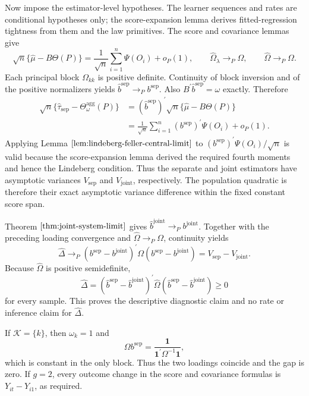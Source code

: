 Now impose the estimator-level hypotheses. The learner sequences and rates are conditional hypotheses only; the score-expansion lemma derives fitted-regression tightness from them and the law primitives. The score and covariance lemmas give
\[
 \sqrt n\{\widehat\mu-B\Theta(P)\}
 =\frac1{\sqrt n}\sum_{i=1}^n\Psi(O_i)+o_P(1),
 \qquad
 \widehat\Omega_\lambda\to_P\Omega,
 \qquad
 \widehat\Omega\to_P\Omega.
\]
Each principal block \(\Omega_{kk}\) is positive definite. Continuity of block inversion and of the positive normalizers yields \(\widehat b^{\mathrm{sep}}\to_Pb^{\mathrm{sep}}\). Also \(B^{\prime}\widehat b^{\mathrm{sep}}=\omega\) exactly. Therefore
\[
\begin{aligned}
 \sqrt n\{\widehat\tau_{\mathrm{sep}}-\Theta_\omega^{\mathrm{agg}}(P)\}
 &=(\widehat b^{\mathrm{sep}})^{\prime}
   \sqrt n\{\widehat\mu-B\Theta(P)\}\\
 &=\frac1{\sqrt n}\sum_{i=1}^n
   (b^{\mathrm{sep}})^{\prime}\Psi(O_i)+o_P(1).
\end{aligned}
\]
Applying Lemma \(\ref{lem:lindeberg-feller-central-limit}\) to \((b^{\mathrm{sep}})^{\prime}\Psi(O_i)/\sqrt n\) is valid because the score-expansion lemma derived the required fourth moments and hence the Lindeberg condition. Thus the separate and joint estimators have asymptotic variances \(V_{\mathrm{sep}}\) and \(V_{\mathrm{joint}}\), respectively. The population quadratic is therefore their exact asymptotic variance difference within the fixed constant score span.

Theorem \(\ref{thm:joint-system-limit}\) gives \(\widehat b^{\mathrm{joint}}\to_Pb^{\mathrm{joint}}\). Together with the preceding loading convergence and \(\widehat\Omega\to_P\Omega\), continuity yields
\[
 \widehat\Delta
 \to_P
 (b^{\mathrm{sep}}-b^{\mathrm{joint}})^{\prime}
 \Omega(b^{\mathrm{sep}}-b^{\mathrm{joint}})
 =V_{\mathrm{sep}}-V_{\mathrm{joint}}.
\]
Because \(\widehat\Omega\) is positive semidefinite,
\[
 \widehat\Delta
 =(\widehat b^{\mathrm{sep}}-\widehat b^{\mathrm{joint}})^{\prime}
 \widehat\Omega
 (\widehat b^{\mathrm{sep}}-\widehat b^{\mathrm{joint}})\ge0
\]
for every sample. This proves the descriptive diagnostic claim and no rate or inference claim for \(\widehat\Delta\).

If \(\mathcal K=\{k\}\), then \(\omega_k=1\) and
\[
 \Omega b^{\mathrm{sep}}
 =\frac{\mathbf 1}{\mathbf 1^{\prime}\Omega^{-1}\mathbf 1},
\]
which is constant in the only block. Thus the two loadings coincide and the gap is zero. If \(g=2\), every outcome change in the score and covariance formulas is \(Y_{it}-Y_{i1}\), as required.
